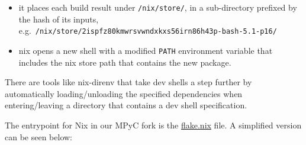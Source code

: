 \begin{itemize}
\tightlist
\item
  it places each build result under \texttt{/nix/store/}, in a
  sub-directory prefixed by the hash of its inputs,
  e.g.~\texttt{/nix/store/2ispfz80kmwrsvwndxkxs56irn86h43p-bash-5.1-p16/}
\item
  nix opens a new shell with a modified \texttt{PATH} environment
  variable that includes the nix store path that contains the new
  package.
\end{itemize}

There are tools like nix-direnv that take dev shells a step further by
automatically loading/unloading the specified dependencies when
entering/leaving a directory that contains a dev shell specification.

\newpage

The entrypoint for Nix in our MPyC fork is the
\href{https://github.com/e-nikolov/mpyc/blob/master/flake.nix}{flake.nix}
file. A simplified version can be seen below:

